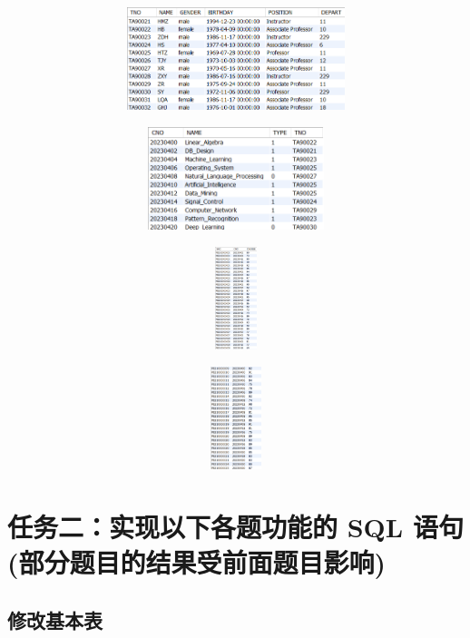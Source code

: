 \documentclass{ctexart}
\begin{document}
		\begin{figure}[H]
			\centering 
			\includegraphics[height=3cm,width=14cm]{3.png}
			\end{figure}
			\begin{figure}[H]
				\centering 
				\includegraphics[height=3cm,width=14cm]{4.png}
				\end{figure}
				\begin{figure}[H]
					\centering 
					\includegraphics[height=3cm,width=14cm]{5.png}
					\end{figure}
					\begin{figure}[H]
						\centering 
						\includegraphics[height=3cm,width=14cm]{6.png}
						\end{figure}
\section{任务二：实现以下各题功能的 SQL 语句(部分题目的结果受前面题目影响)}

\subsection{修改基本表}
\end{document}
